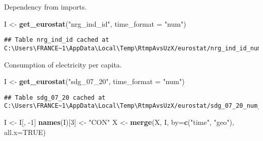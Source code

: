 \documentclass[
]{article}
\newenvironment{Shaded}{\begin{snugshade}}{\end{snugshade}}
\newcommand{\DataTypeTok}[1]{\textcolor[rgb]{0.13,0.29,0.53}{#1}}
\newcommand{\DecValTok}[1]{\textcolor[rgb]{0.00,0.00,0.81}{#1}}
\newcommand{\KeywordTok}[1]{\textcolor[rgb]{0.13,0.29,0.53}{\textbf{#1}}}
\newcommand{\NormalTok}[1]{#1}
\newcommand{\OperatorTok}[1]{\textcolor[rgb]{0.81,0.36,0.00}{\textbf{#1}}}
\newcommand{\OtherTok}[1]{\textcolor[rgb]{0.56,0.35,0.01}{#1}}
\newcommand{\StringTok}[1]{\textcolor[rgb]{0.31,0.60,0.02}{#1}}
\begin{document}
Dependency from imports.

\begin{Shaded}
\begin{Highlighting}[]
\NormalTok{I \textless{}{-}}\StringTok{ }\KeywordTok{get\_eurostat}\NormalTok{(}\StringTok{"nrg\_ind\_id"}\NormalTok{, }\DataTypeTok{time\_format =} \StringTok{"num"}\NormalTok{)}
\end{Highlighting}
\end{Shaded}

\begin{verbatim}
## Table nrg_ind_id cached at C:\Users\FRANCE~1\AppData\Local\Temp\RtmpAvsUzX/eurostat/nrg_ind_id_num_code_FF.rds
\end{verbatim}

\begin{Shaded}
\end{Shaded}

Consumption of electricity per capita.

\begin{Shaded}
\begin{Highlighting}[]
\NormalTok{I \textless{}{-}}\StringTok{ }\KeywordTok{get\_eurostat}\NormalTok{(}\StringTok{"sdg\_07\_20"}\NormalTok{, }\DataTypeTok{time\_format =} \StringTok{"num"}\NormalTok{)}
\end{Highlighting}
\end{Shaded}

\begin{verbatim}
## Table sdg_07_20 cached at C:\Users\FRANCE~1\AppData\Local\Temp\RtmpAvsUzX/eurostat/sdg_07_20_num_code_FF.rds
\end{verbatim}

\begin{Shaded}
\begin{Highlighting}[]
\NormalTok{I \textless{}{-}}\StringTok{ }\NormalTok{I[, }\DecValTok{{-}1}\NormalTok{]}
\KeywordTok{names}\NormalTok{(I)[}\DecValTok{3}\NormalTok{] \textless{}{-}}\StringTok{ "CON"}
\NormalTok{X \textless{}{-}}\StringTok{ }\KeywordTok{merge}\NormalTok{(X, I, }\DataTypeTok{by=}\KeywordTok{c}\NormalTok{(}\StringTok{"time"}\NormalTok{, }\StringTok{"geo"}\NormalTok{), }\DataTypeTok{all.x=}\OtherTok{TRUE}\NormalTok{)}
\end{Highlighting}
\end{Shaded}
\end{document}
